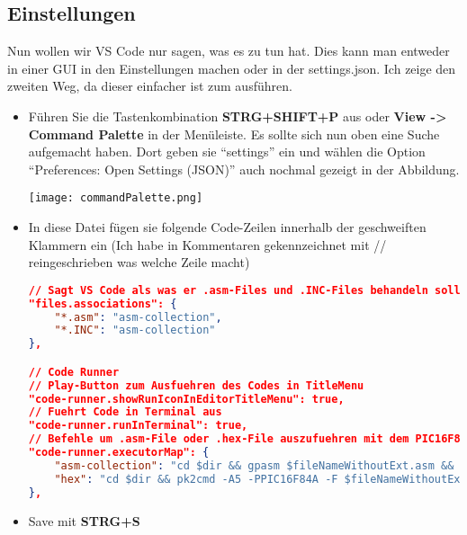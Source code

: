\subsection{Einstellungen}
Nun wollen wir VS Code nur sagen, was es zu tun hat. Dies kann man entweder in einer GUI in den Einstellungen machen oder in der {\ttfamily settings.json}. Ich zeige den zweiten Weg, da dieser einfacher ist zum ausführen.
\begin{itemize}
    \item[1)] Führen Sie die Tastenkombination \textbf{STRG+SHIFT+P} aus oder \textbf{View -> Command Palette} in der Menüleiste. Es sollte sich nun oben eine Suche aufgemacht haben. Dort geben sie \enquote{settings} ein und wählen die Option \enquote{Preferences: Open Settings (JSON)} auch nochmal gezeigt in der Abbildung.
    \begin{center}
        \texttt{[image: commandPalette.png]}
    \end{center}
    \item[2)] In diese Datei fügen sie folgende Code-Zeilen innerhalb der geschweiften Klammern ein (Ich habe in Kommentaren gekennzeichnet mit // reingeschrieben was welche Zeile macht)
\begin{lstlisting}[language=json]
// Sagt VS Code als was er .asm-Files und .INC-Files behandeln soll
"files.associations": {
    "*.asm": "asm-collection",
    "*.INC": "asm-collection"
},

// Code Runner
// Play-Button zum Ausfuehren des Codes in TitleMenu
"code-runner.showRunIconInEditorTitleMenu": true,
// Fuehrt Code in Terminal aus
"code-runner.runInTerminal": true,
// Befehle um .asm-File oder .hex-File auszufuehren mit dem PIC16F84A als Standard PIC
"code-runner.executorMap": {
    "asm-collection": "cd $dir && gpasm $fileNameWithoutExt.asm &&  pk2cmd -A5 -PPIC16F84A -F $fileNameWithoutExt.hex -M -T -R && cd $workspaceRoot",
    "hex": "cd $dir && pk2cmd -A5 -PPIC16F84A -F $fileNameWithoutExt.hex -M -T -R"
},
\end{lstlisting}
    \item[3)] Save mit \textbf{STRG+S}
\end{itemize}

